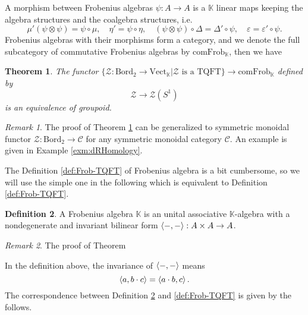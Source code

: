 \documentclass[10pt,reqno,final]{article}
\numberwithin{equation}{section}
\numberwithin{figure}{section}
\numberwithin{table}{section}
\theoremstyle{plain}
\newtheorem{theorem}{Theorem}[section]
\theoremstyle{definition}
\newtheorem{definition}[theorem]{Definition}
\theoremstyle{remark}
\newtheorem{remark}{Remark}[theorem]
\begin{document}
    A morphism between Frobenius algebras \(\psi:A\to A\) is a \(\mathbb{K}\) linear maps keeping the algebra structures and the coalgebra structures, i.e. 
    \begin{equation}
      \mu'(\psi\otimes\psi)=\psi\circ\mu,\quad \eta'=\psi\circ\eta,\quad (\psi\otimes\psi)\circ\Delta=\Delta'\circ\psi,\quad \varepsilon=\varepsilon'\circ\psi.
    \end{equation}
    Frobenius algebras with their morphisms form a category, and we denote the full subcategory of commutative Frobenius algebras by \(\mathrm{comFrob}_{\mathbb{K}}\), then we have 
    \begin{theorem}\label{thm:Dim2<->comFrob}
      The functor \(\{ \mathcal{Z}:\mathrm{Bord}_{2}\to \mathrm{Vect}_{\mathbb{K}}|\mathcal{Z}\text{ is a TQFT} \}\to \mathrm{comFrob}_{\mathbb{K}}\) defined by 
      \begin{equation}
        \mathcal{Z}\to \mathcal{Z}(S^{1})
      \end{equation}
      is an equivalence of groupoid.
    \end{theorem}

    \begin{remark}\label{rmk:extensionofTQFT}
      The proof of Theorem \ref{thm:Dim2<->comFrob} can be generalized to symmetric monoidal functor \(\mathcal{Z}:\mathrm{Bord}_{2}\to \mathcal{C}\) for any symmetric monoidal category \(\mathcal{C}\). An example is given in Example \ref{exm:dRHomology}.
    \end{remark}

    The Definition \ref{def:Frob-TQFT} of Frobenius algebra is a bit cumbersome, so we will use the simple one in the following which is equivalent to Definition \ref{def:Frob-TQFT}.

    \begin{definition}\label{def:Frob-origin}
      A Frobenius algebra \(\mathbb{K}\) is an unital associative \(\mathbb{K}\)-algebra with a nondegenerate and invariant bilinear form \(\braket{-,-} :A\times A\to A \).
    \end{definition}
    \begin{remark}
      The proof of Theorem
    \end{remark}
    In the definition above, the invariance of \(\braket{-,-} \) means
    \[
      \braket{a,b\cdot c}=\braket{a\cdot b,c}.  
    \]
    The correspondence between Definition \ref{def:Frob-origin} and \ref{def:Frob-TQFT} is given by the follows. 
    
\end{document}
